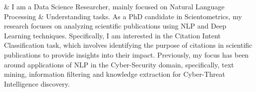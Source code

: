 %
\color{gray}{Summary}
& I am a Data Science Researcher, mainly focused on Natural Language Processing \& Understanding tasks. 
As a PhD candidate in Scientometrics, my research focuses on analyzing scientific publications using NLP and Deep Learning techniques. Specifically, I am interested in the Citation Intent Classification task, which involves identifying the purpose of citations in scientific publications to provide insights into their impact. Previously, my focus has been around applications of NLP in the Cyber-Security domain, specifically, text mining, information filtering and knowledge extraction for Cyber-Threat Intelligence discovery. \\